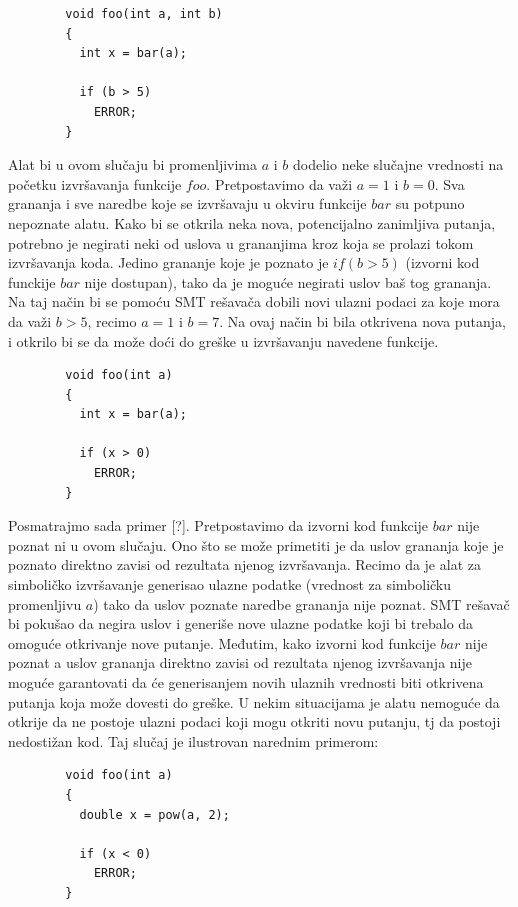 \documentclass[12pt]{article}
\begin{document}
\bigbreak
    \begin{lstlisting}
        void foo(int a, int b)
        {
          int x = bar(a);
          
          if (b > 5)
            ERROR;
        }
    \end{lstlisting}
\bigbreak

Alat bi u ovom slučaju bi promenljivima $a$ i $b$ dodelio neke slučajne vrednosti na početku izvršavanja funkcije $foo$. Pretpostavimo da važi $a = 1$ i $b = 0$. Sva grananja i sve naredbe koje se izvršavaju u okviru funkcije $bar$ su potpuno nepoznate alatu. Kako bi se otkrila neka nova, potencijalno zanimljiva putanja, potrebno je negirati neki od uslova u grananjima kroz koja se prolazi tokom izvršavanja koda. Jedino grananje koje je poznato je $if (b > 5)$ (izvorni kod funckije $bar$ nije dostupan), tako da je moguće negirati uslov baš tog grananja. Na taj način bi se pomoću SMT rešavača dobili novi ulazni podaci za koje mora da važi $b > 5$, recimo $a = 1$ i $b = 7$. Na ovaj način bi bila otkrivena nova putanja, i otkrilo bi se da može doći do greške u izvršavanju navedene funkcije.

\bigbreak
    \begin{lstlisting}
        void foo(int a)
        {
          int x = bar(a);
          
          if (x > 0)
            ERROR;
        }
    \end{lstlisting}
\bigbreak

Posmatrajmo sada primer [?]. Pretpostavimo da izvorni kod funkcije $bar$ nije poznat ni u ovom slučaju. Ono što se može primetiti je da uslov grananja koje je poznato direktno zavisi od rezultata njenog izvršavanja. Recimo da je alat za simboličko izvršavanje generisao ulazne podatke (vrednost za simboličku promenljivu $a$) tako da uslov poznate naredbe grananja nije poznat. SMT rešavač bi pokušao da negira uslov i generiše nove ulazne podatke koji bi trebalo da omoguće otkrivanje nove putanje. Međutim, kako izvorni kod funkcije $bar$ nije poznat a uslov grananja direktno zavisi od rezultata njenog izvršavanja nije moguće garantovati da će generisanjem novih ulaznih vrednosti biti otkrivena putanja koja može dovesti do greške. U nekim situacijama je alatu nemoguće da otkrije da ne postoje ulazni podaci koji mogu otkriti novu putanju, tj da postoji nedostižan kod. Taj slučaj je ilustrovan narednim primerom:

\bigbreak
    \begin{lstlisting}
        void foo(int a)
        {
          double x = pow(a, 2);
          
          if (x < 0)
            ERROR;
        }
    \end{lstlisting}
\bigbreak
\end{document}
